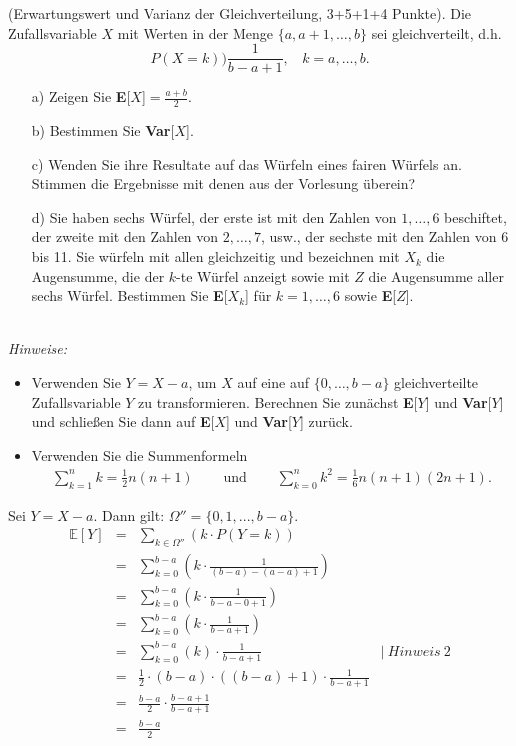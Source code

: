 \documentclass[twoside]{article}
\begin{document}
(Erwartungswert und Varianz der Gleichverteilung, 3+5+1+4 Punkte).
Die Zufallsvariable $X$ mit Werten in der Menge $\{a,a+1,\dots,b\}$ sei gleichverteilt, d.h.
\[
	P(X=k))\frac{1}{b-a+1},~~~~k=a,\dots,b.
\]
\begin{enumerate}
	\item[a)] Zeigen Sie \textbf{E}[$X$]$=\frac{a+b}{2}$.
	\item[b)] Bestimmen Sie \textbf{Var}[$X$].
	\item[c)] Wenden Sie ihre Resultate auf das Würfeln eines fairen Würfels an.
		Stimmen die Ergebnisse mit denen aus der Vorlesung überein?
	\item[d)] Sie haben sechs Würfel, der erste ist mit den Zahlen von $1,\dots,6$ beschiftet, der zweite mit den Zahlen von $2,\dots,7$, usw., der sechste mit den Zahlen von 6 bis 11.
		Sie würfeln mit allen gleichzeitig und bezeichnen mit $X_k$ die Augensumme, die der $k$-te Würfel anzeigt sowie mit $Z$ die Augensumme aller sechs Würfel.
		Bestimmen Sie \textbf{E}[$X_k$] für $k=1,\dots,6$ sowie \textbf{E}[$Z$].
\end{enumerate}
\vspace{-.2cm}\-\\
\textit{Hinweise:}
\begin{itemize}
	\item Verwenden Sie $Y=X-a$, um $X$ auf eine auf $\{0,\dots,b-a\}$ gleichverteilte Zufallsvariable $Y$ zu transformieren.
		Berechnen Sie zunächst \textbf{E}[$Y$] und \textbf{Var}[$Y$] und schließen Sie dann auf \textbf{E}[$X$] und \textbf{Var}[$Y$] zurück.
	\item Verwenden Sie die Summenformeln
	\[
		\begin{array}{ccc}
			\sum_{k=1}^{n}k = \frac{1}{2} n(n+1)	&	\text{~~~~und~~~~}	&	\sum_{k=0}^{n}k^2=\frac{1}{6}n(n+1)(2n+1).
		\end{array}
	\]
\end{itemize}
\sss
Sei $Y = X - a$.
Dann gilt: $\Omega'' = \{0, 1, ..., b-a\}$.
\begin{equation*}
    \begin{array}{rlll}
        \mathbb{E}[Y]&=    &\sum_{k \in \Omega''}(k \cdot P(Y = k))&\\
            &=    &\sum_{k = 0}^{b-a}(k \cdot \frac{1}{(b-a)-(a-a)+1})&\\
            &=    &\sum_{k = 0}^{b-a}(k \cdot \frac{1}{b-a-0+1})&\\
            &=    &\sum_{k = 0}^{b-a}(k \cdot \frac{1}{b-a+1})&\\
            &=    &\sum_{k = 0}^{b-a}(k) \cdot \frac{1}{b-a+1}& |~Hinweis~2\\
            &=    &\frac{1}{2} \cdot (b - a) \cdot((b - a) + 1) \cdot \frac{1}{b-a+1}&\\
            &=    &\frac{b-a}{2} \cdot \frac{b - a + 1}{b-a+1}&\\
            &=    &\frac{b - a}{2}&\\
    \end{array}
\end{equation*}
\end{document}
